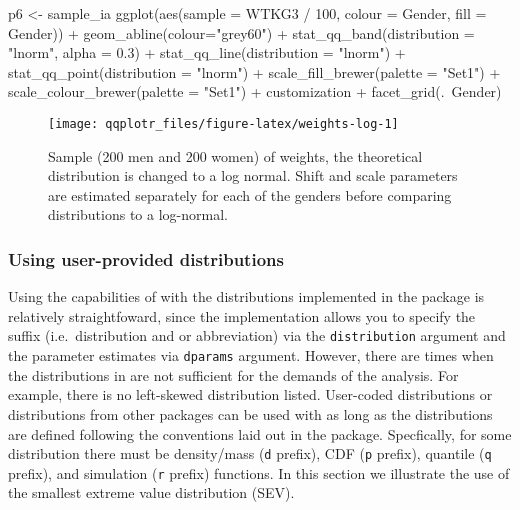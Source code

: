 \begin{Schunk}
\begin{Sinput}
p6 <- sample_ia %>% 
  ggplot(aes(sample = WTKG3 / 100, colour = Gender, fill = Gender)) +
  geom_abline(colour="grey60") +
  stat_qq_band(distribution = "lnorm", alpha = 0.3) +
  stat_qq_line(distribution = "lnorm") +
  stat_qq_point(distribution = "lnorm") +
  scale_fill_brewer(palette = "Set1") +
  scale_colour_brewer(palette = "Set1") +
  customization + facet_grid(.~Gender)
\end{Sinput}
\begin{figure}

{\centering \texttt{[image: qqplotr\_files/figure-latex/weights-log-1]} 

}

\caption[Sample (200 men and 200 women) of weights, the theoretical distribution  is changed to a log normal]{Sample (200 men and 200 women) of weights, the theoretical distribution  is changed to a log normal. Shift and scale parameters are estimated separately for each of the genders before comparing distributions to a log-normal.}\label{fig:weights-log}
\end{figure}
\end{Schunk}

\subsubsection{Using user-provided
distributions}\label{using-user-provided-distributions}

\label{sec:user-dists}


Using the capabilities of  with the distributions
implemented in the  package is relatively straightfoward,
since the implementation allows you to specify the suffix
(i.e.~distribution and or abbreviation) via the \texttt{distribution}
argument and the parameter estimates via \texttt{dparams} argument.
However, there are times when the distributions in  are not
sufficient for the demands of the analysis. For example, there is no
left-skewed distribution listed. User-coded distributions or
distributions from other packages can be used with  as long
as the distributions are defined following the conventions laid out in
the  package. Specfically, for some distribution there must
be density/mass (\texttt{d} prefix), CDF (\texttt{p} prefix), quantile
(\texttt{q} prefix), and simulation (\texttt{r} prefix) functions. In
this section we illustrate the use of the smallest extreme value
distribution (SEV).


